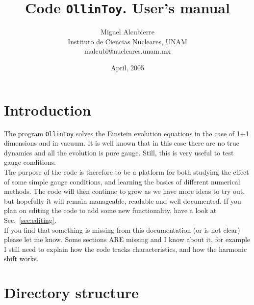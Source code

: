\documentclass[12pt]{article}
\begin{document}

\renewcommand{\theequation}{\thesection.\arabic{equation}}

\parindent 0mm



\title{Code \texttt{OllinToy}.  User's manual}

\author{Miguel Alcubierre \\
Instituto de Ciencias Nucleares, UNAM \\
malcubi@nucleares.unam.mx}

\date{April, 2005}

\maketitle

\tableofcontents



\pagebreak
\section{Introduction}

The program \texttt{OllinToy} solves the Einstein evolution equations
in the case of 1+1 dimensions and in vacuum.  It is well known that in
this case there are no true dynamics and all the evolution is pure
gauge.  Still, this is very useful to test gauge conditions. \\

The purpose of the code is therefore to be a platform for both
studying the effect of some simple gauge conditions, and learning the
basics of different numerical methods.  The code will then continue to
grow as we have more ideas to try out, but hopefully it will remain
manageable, readable and well documented. If you plan on editing the
code to add some new functionality, have a look at
Sec.~\ref{sec:editing}. \\

If you find that something is missing from this documentation (or is
not clear) please let me know.  Some sections ARE missing and I know
about it, for example I still need to explain how the code tracks
characteristics, and how the harmonic shift works.



\section{Directory structure}
\end{document}

